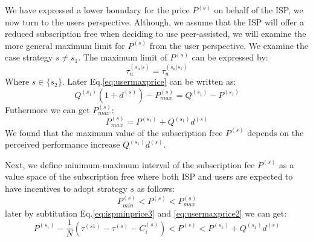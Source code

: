 \documentclass[paper]{ieice}
\begin{document}
We have expressed a lower boundary for the price $P^{(s)}$ on behalf of the ISP, we now turn to the users perspective.  
Although, we assume that the ISP will offer a reduced subscription free when deciding to use peer-assisted, we will examine the more general maximum limit for $P^{(s)}$ from the user perspective.
We examine the case strategy $s \neq s_1$.
The maximum limit of $P^{(s)}$ can be expressed by:
\begin{equation}\label{eq:usermaxprice}
	\tau^{(s_a|s)}_u = \tau^{(s_a|s_1)}_u
\end{equation}
Where $s \in \{s_2\}$. Later Eq.\ref{eq:usermaxprice} can be written as:
\begin{equation}
	Q^{(s_1)} ( 1 + d^{(s)} ) - P^{(s)}_{max} = Q^{(s_1)} - P^{(s_1)}
\end{equation}
Futhermore we can get $P^{(s)}_{max}$:  
\begin{equation}\label{eq:usermaxprice2}
	P^{(s)}_{max} = P^{(s_1)} + Q^{(s_1)} d^{(s)}
\end{equation}
We found that the maximum value of the subscription free $P^{(s)}$ depends on the perceived performance increase $Q^{(s_1)} d^{(s)}$.

\newtheorem{theorem11}{Definition}
\begin{theorem}
Next, we define minimum-maximum interval of the subscription fee $P^{(s)}$ as a value space of the subscription free where both ISP and users are expected to have incentives to adopt strategy $s$ as follows:
\begin{equation}
	P^{(s)}_{min} < P^{(s)} < P^{(s)}_{max}
\end{equation}
later by subtitution Eq.\ref{eq:ispminprice3} and \ref{eq:usermaxprice2} we can get:
\begin{equation}\label{eq:min-max-interval}
	P^{(s_1)} - \frac{1}{N} ( \tau^{(s1)} - \tau^{(s)} -  C^{(s)}_i  ) < P^{(s)} <  P^{(s_1)} + Q^{(s_1)} d^{(s)} 
\end{equation}
\end{theorem}
\end{document}
